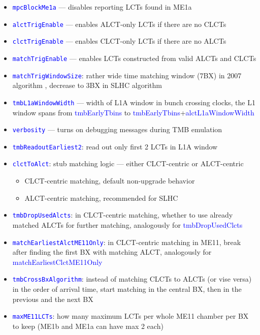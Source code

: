 \begin{itemize}
  \item \textcolor{blue}{\texttt{mpcBlockMe1a}} --- disables reporting LCTs found in ME1a
  \item \textcolor{blue}{\texttt{alctTrigEnable}} --- enables ALCT-only LCTs if there are no CLCTs
  \item \textcolor{blue}{\texttt{clctTrigEnable}} --- enables CLCT-only LCTs if there are no ALCTs
  \item \textcolor{blue}{\texttt{matchTrigEnable}} --- enables LCTs constructed from valid ALCTs and CLCTs
  \item \textcolor{blue}{\texttt{matchTrigWindowSize}}: rather wide time matching window (7BX) in 2007 algorithm , decrease to 3BX in SLHC algorithm
  \item \textcolor{blue}{\texttt{tmbL1aWindowWidth}} --- width of L1A window in bunch crossing clocks, the L1 window spans from \textcolor{blue}{tmbEarlyTbins} to \textcolor{blue}{tmbEarlyTbins}+\textcolor{blue}{alctL1aWindowWidth}
  \item \textcolor{blue}{\texttt{verbosity}} --- turns on debugging messages during TMB emulation
  \item \textcolor{blue}{\texttt{tmbReadoutEarliest2}}: read out only first 2 LCTs in L1A window
  \item \textcolor{blue}{\texttt{clctToAlct}}: stub matching logic --- either CLCT-centric or ALCT-centric
  \begin{itemize}
    \item CLCT-centric matching, default non-upgrade behavior
    \item ALCT-centric matching, recommended for SLHC
  \end{itemize}
  \item \textcolor{blue}{\texttt{tmbDropUsedAlcts}}: in CLCT-centric matching, whether to use already matched ALCTs for further matching, analogously for \textcolor{blue}{tmbDropUsedClcts}
  \item \textcolor{blue}{\texttt{matchEarliestAlctME11Only}}: in CLCT-centric matching in ME11, break after finding the first BX with matching ALCT, analogously for \textcolor{blue}{matchEarliestClctME11Only}
  \item \textcolor{blue}{\texttt{tmbCrossBxAlgorithm}}: instead of matching CLCTs to ALCTs (or vise versa) in the order of arrival time, start matching in the central BX, then in the previous and the next BX
  \item \textcolor{blue}{\texttt{maxME11LCTs}}: how many maximum LCTs per whole ME11 chamber per BX to keep (ME1b and ME1a can have max 2 each)
\end{itemize}

\newpage
